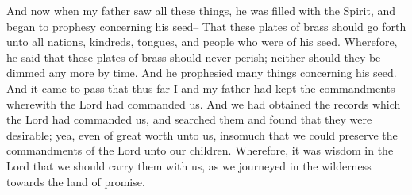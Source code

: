 And now when my father saw all these things, he was filled with the Spirit, and began to prophesy concerning his seed--
\bverse \iffalse That these plates of brass should go forth unto all nations, kindreds, tongues, and people who were of his seed. \fi
That these plates of brass should go forth unto all nations, kindreds, tongues, and people who were of his seed.
\bverse \iffalse Wherefore, he said that these plates of brass should never perish; neither should they be dimmed any more by time. And he prophesied many things concerning his seed. \fi
Wherefore, he said that these plates of brass should never perish; neither should they be dimmed any more by time. And he prophesied many things concerning his seed.
\bverse \iffalse And it came to pass that thus far I and my father had kept the commandments wherewith the Lord had commanded us. \fi
And it came to pass that thus far I and my father had kept the commandments wherewith the Lord had commanded us.
\bverse \iffalse And we had obtained the records which the Lord had commanded us, and searched them and found that they were desirable; yea, even of great worth unto us, insomuch that we could preserve the commandments of the Lord unto our children. \fi
And we had obtained the records which the Lord had commanded us, and searched them and found that they were desirable; yea, even of great worth unto us, insomuch that we could preserve the commandments of the Lord unto our children.
\bverse \iffalse Wherefore, it was wisdom in the Lord that we should carry them with us, as we journeyed in the wilderness towards the land of promise. \fi
Wherefore, it was wisdom in the Lord that we should carry them with us, as we journeyed in the wilderness towards the land of promise.

